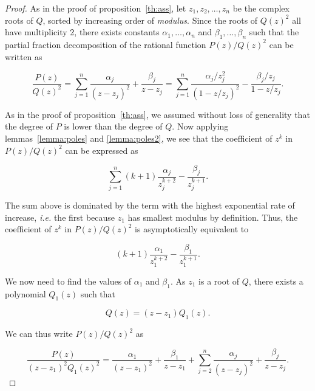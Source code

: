 \documentclass{article}
\begin{document}
\begin{proof}
As in the proof of proposition~\ref{th:ass}, let $z_1, z_2, \ldots, z_n$
be the complex roots of $Q$, sorted by increasing order of
\textit{modulus}. Since the roots of $Q(z)^2$ all have multiplicity 2,
there exists constants $\alpha_1, \ldots, \alpha_n$ and $\beta_1, \ldots,
\beta_n$ such that the partial fraction decomposition of the rational
function $P(z)/Q(z)^2$ can be written as

\begin{equation*}
\frac{P(z)}{Q(z)^2} = 
\sum_{j=1}^n \frac{\alpha_j}{(z-z_j)^2} + \frac{\beta_j}{z-z_j} =
\sum_{j=1}^n \frac{\alpha_j/z_j^2}{(1-z/z_j)^2}
-\frac{\beta_j/z_j}{1-z/z_j}.
\end{equation*}

As in the proof of proposition~\ref{th:ass}, we assumed without loss of
generality that the degree of $P$ is lower than the degree of $Q$. Now
applying lemmas~\ref{lemma:poles} and \ref{lemma:poles2}, we see that
the coefficient of $z^k$ in $P(z)/Q(z)^2$ can be expressed as

\begin{equation}
\label{eq:fullass2}
\sum_{j=1}^n (k+1)\frac{\alpha_j}{z_j^{k+2}}-\frac{\beta_j}{z_j^{k+1}}.
\end{equation}

The sum above is dominated by the term with the highest exponential rate
of increase, \textit{i.e.} the first because $z_1$ has smallest modulus by
definition. Thus, the coefficient of $z^k$ in $P(z)/Q(z)^2$ is
asymptotically equivalent to 

\begin{equation*}
(k+1)\frac{\alpha_1}{z_1^{k+2}}-\frac{\beta_1}{z_1^{k+1}}.
\end{equation*}

We now need to find the values of $\alpha_1$ and $\beta_1$. As $z_1$ is a
root of $Q$, there exists a polynomial $Q_1(z)$ such that

\begin{equation}
\label{eq:Q1}
Q(z) = (z-z_1)Q_1(z).
\end{equation}

We can thus write $P(z)/Q(z)^2$ as

\begin{equation}
\label{eq:misc1}
\frac{P(z)}{(z-z_1)^2Q_1(z)^2} = \frac{\alpha_1}{(z-z_1)^2} +
\frac{\beta_1}{z-z_1} +
\sum_{j=2}^n \frac{\alpha_j}{(z-z_j)^2} + \frac{\beta_j}{z-z_j}.
\end{equation}


\end{proof}
\end{document}
